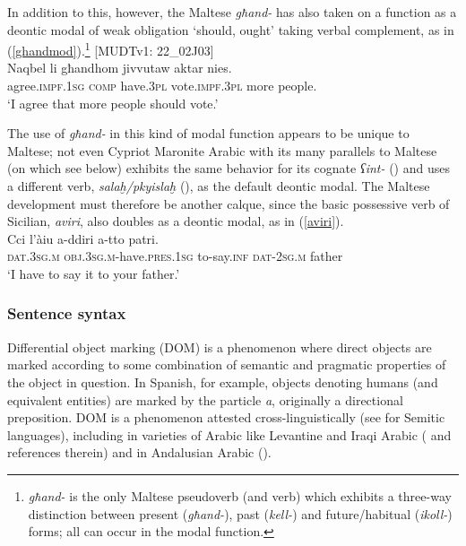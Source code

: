 \documentclass[output=paper]{langsci/langscibook}
\begin{document}
In addition to this, however, the Maltese \textit{għand-} has also taken on a function as a deontic modal of weak obligation `should, ought' taking verbal complement, as in (\ref{ghandmod}).\footnote{\textit{għand-} is the only Maltese pseudoverb (and verb) which exhibits a three-way distinction between present (\textit{għand-}), past (\textit{kell-}) and future/habitual (\textit{ikoll-}) forms; all can occur in the modal function.}
\ea\label{ghandmod}   
{[MUDTv1: 22\_02J03]} \\
    \gll Naqbel	li għandhom jivvutaw aktar nies.\\
	agree.\textsc{impf.1sg} \textsc{comp} have.\textsc{3pl} vote.\textsc{impf.3pl} more people.\\
	\glt `I agree that more people should vote.'\\
\z

The use of \textit{għand-} in this kind of modal function appears to be unique to Maltese; not even Cypriot Maronite Arabic with its many parallels to Maltese (on which see below) exhibits the same behavior for its cognate \textit{ʕint-} (\citealt[346]{Borg2004}) and uses a different verb, \textit{salaḫ/pkyislaḫ} (\citealt[323]{Borg2004}), as the default deontic modal. The Maltese development must therefore be another calque, since the basic possessive verb of Sicilian, \textit{aviri}, also doubles as a deontic modal, as in (\ref{aviri}).
\ea\label{aviri} 
    \\
    \gll Cci l'àiu a-ddiri a-tto patri.\\
	\textsc{dat.3sg.m} \textsc{obj.3sg.m}-have.\textsc{pres.1sg} to-say.\textsc{inf} \textsc{dat-2sg.m} father\\
	\glt `I have to say it to your father.'\\
\z

\subsubsection{Sentence syntax}
Differential object marking (DOM) is a phenomenon where direct objects are marked according to some combination of semantic and pragmatic properties of the object in question. In Spanish, for example, objects denoting humans (and equivalent entities) are marked by the particle \textit{a}, originally a directional preposition. DOM is a phenomenon attested cross-linguistically (see \citealt{Khan1984} for Semitic languages), including in varieties of Arabic like Levantine and Iraqi Arabic (\citealt{Coghill2014} and references therein) and in Andalusian Arabic (\citealt[108]{Andalusi2013}).
\end{document}
